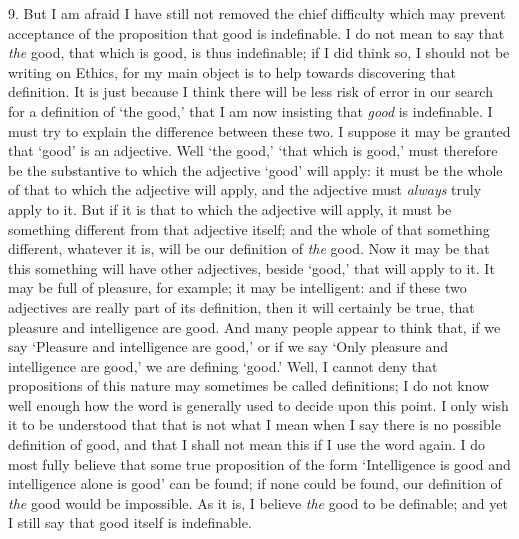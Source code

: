 9. But I am afraid I have still not removed the chief difficulty which
may prevent acceptance of the proposition that good is indefinable. I
do not mean to say that \textit{the} good, that which is good, is thus
indefinable; if I did think so, I should not  be writing on
Ethics, for my main object is to help towards discovering that
definition. It is just because I think there will be less risk of
error in our search for a definition of `the good,' that I am now
insisting that \textit{good} is indefinable. I must try to explain the
difference between these two. I suppose it may be granted that `good'
is an adjective. Well `the good,' `that which is good,' must therefore
be the substantive to which the adjective `good' will apply: it must
be the whole of that to which the adjective will apply, and the
adjective must \textit{always} truly apply to it. But if it is that to
which the adjective will apply, it must be something different from
that adjective itself; and the whole of that something different,
whatever it is, will be our definition of \textit{the} good. Now it
may be that this something will have other adjectives, beside `good,'
that will apply to it. It may be full of pleasure, for example; it may
be intelligent: and if these two adjectives are really part of its
definition, then it will certainly be true, that pleasure and
intelligence are good. And many people appear to think that, if we say
`Pleasure and intelligence are good,' or if we say `Only pleasure and
intelligence are good,' we are defining `good.' Well, I cannot deny
that propositions of this nature may sometimes be called definitions;
I do not know well enough how the word is generally used to decide
upon this point. I only wish it to be understood that that is not what
I mean when I say there is no possible definition of good, and that I
shall not mean this if I use the word again. I do most fully believe
that some true proposition of the form `Intelligence is good and
intelligence alone is good' can be found; if none could be found, our
definition of \textit{the} good would be impossible. As it is, I
believe \textit{the} good to be definable; and yet I still say that
good itself is indefinable.

